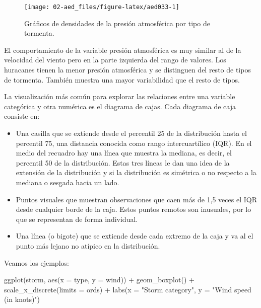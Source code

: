 \documentclass[
]{book}
\newenvironment{Shaded}{\begin{snugshade}}{\end{snugshade}}
\newcommand{\AttributeTok}[1]{\textcolor[rgb]{0.77,0.63,0.00}{#1}}
\newcommand{\FunctionTok}[1]{\textcolor[rgb]{0.00,0.00,0.00}{#1}}
\newcommand{\NormalTok}[1]{#1}
\newcommand{\SpecialCharTok}[1]{\textcolor[rgb]{0.00,0.00,0.00}{#1}}
\newcommand{\StringTok}[1]{\textcolor[rgb]{0.31,0.60,0.02}{#1}}
\providecommand{\tightlist}{%
  \setlength{\itemsep}{0pt}\setlength{\parskip}{0pt}}
\begin{document}
\begin{figure}

{\centering \texttt{[image: 02-aed\_files/figure-latex/aed033-1]} 

}

\caption{Gráficos de densidades de la presión atmosférica por tipo de tormenta.}\label{fig:aed033}
\end{figure}

El comportamiento de la variable presión atmosférica es muy similar al de la velocidad del viento pero en la parte izquierda del rango de valores. Los huracanes tienen la menor presión atmosférica y se distinguen del resto de tipos de tormenta. También muestra una mayor variabilidad que el resto de tipos.

La visualización más común para explorar las relaciones entre una variable categórica y otra numérica es el diagrama de cajas. Cada diagrama de caja consiste en:

\begin{itemize}
\tightlist
\item
  Una casilla que se extiende desde el percentil 25 de la distribución hasta el percentil 75, una distancia conocida como rango intercuartílico (IQR). En el medio del recuadro hay una línea que muestra la mediana, es decir, el percentil 50 de la distribución. Estas tres líneas le dan una idea de la extensión de la distribución y si la distribución es simétrica o no respecto a la mediana o sesgada hacia un lado.
\item
  Puntos visuales que muestran observaciones que caen más de 1,5 veces el IQR desde cualquier borde de la caja. Estos puntos remotos son inusuales, por lo que se representan de forma individual.
\item
  Una línea (o bigote) que se extiende desde cada extremo de la caja y va al el punto más lejano no atípico en la distribución.
\end{itemize}

Veamos los ejemplos:

\begin{Shaded}
\begin{Highlighting}[]
\FunctionTok{ggplot}\NormalTok{(storm, }\FunctionTok{aes}\NormalTok{(}\AttributeTok{x =}\NormalTok{ type, }\AttributeTok{y =}\NormalTok{ wind)) }\SpecialCharTok{+} 
  \FunctionTok{geom\_boxplot}\NormalTok{() }\SpecialCharTok{+} 
  \FunctionTok{scale\_x\_discrete}\NormalTok{(}\AttributeTok{limits =}\NormalTok{ ords) }\SpecialCharTok{+}
  \FunctionTok{labs}\NormalTok{(}\AttributeTok{x =} \StringTok{"Storm category"}\NormalTok{, }\AttributeTok{y =} \StringTok{"Wind speed (in knots)"}\NormalTok{) }
\end{Highlighting}
\end{Shaded}
\end{document}
